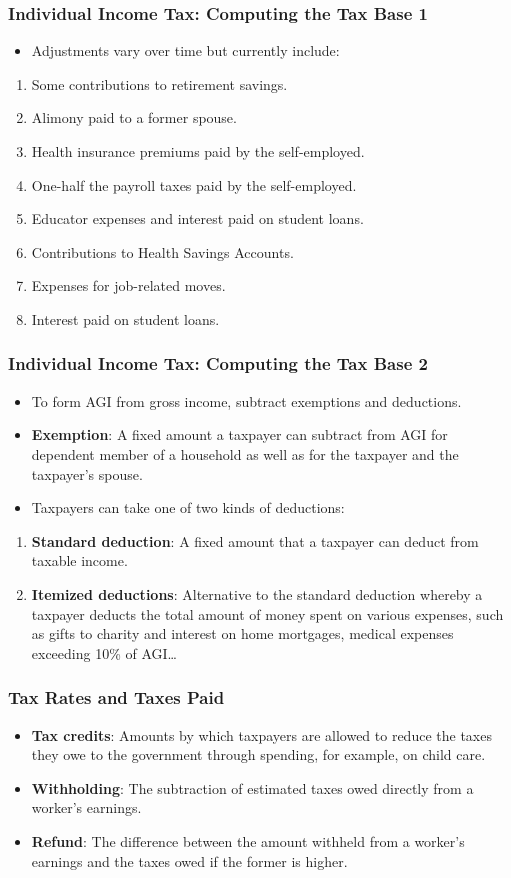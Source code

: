 \documentclass[aspectratio=169]{beamer}
\begin{document}
\begin{frame}
\frametitle{Individual Income Tax: Computing the Tax Base 1}
\begin{itemize}
  \item Adjustments vary over time but currently include:
\end{itemize}
\begin{enumerate}
  \item Some contributions to retirement savings.
  \item Alimony paid to a former spouse.
  \item Health insurance premiums paid by the self-employed.
  \item One-half the payroll taxes paid by the self-employed.
  \item Educator expenses and interest paid on student loans.
  \item Contributions to Health Savings Accounts.
  \item Expenses for job-related moves.
  \item Interest paid on student loans.
\end{enumerate}
\end{frame}

\begin{frame}
\frametitle{Individual Income Tax: Computing the Tax Base 2}
\begin{itemize}
  \item To form AGI from gross income, subtract exemptions and deductions.
  \item \textbf{Exemption}: A fixed amount a taxpayer can subtract from AGI for dependent member of a household as well as for the taxpayer and the taxpayer's spouse.
  \item Taxpayers can take one of two kinds of deductions:
\end{itemize}
\begin{enumerate}
    \item \textbf{Standard deduction}: A fixed amount that a taxpayer can deduct from taxable income.
    \item \textbf{Itemized deductions}: Alternative to the standard deduction whereby a taxpayer deducts the total amount of money spent on various expenses, such as gifts to charity and interest on home mortgages, medical expenses exceeding 10\% of AGI\ldots
  \end{enumerate}
\end{frame}

\begin{frame}
\frametitle{Tax Rates and Taxes Paid}
\begin{itemize}
  \item \textbf{Tax credits}: Amounts by which taxpayers are allowed to reduce the taxes they owe to the government through spending, for example, on child care.
  \item \textbf{Withholding}: The subtraction of estimated taxes owed directly from a worker's earnings.
  \item \textbf{Refund}: The difference between the amount withheld from a worker's earnings and the taxes owed if the former is higher.
\end{itemize}
\end{frame}
\end{document}
